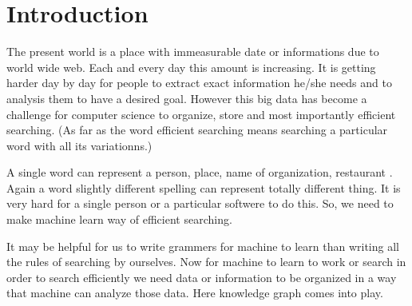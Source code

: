 \chapter{Introduction}\label{intro}

The present world is a place with immeasurable date or informations due to world wide web.
 Each and every day this amount is increasing. It is getting harder day by day for people to extract 
 exact information he/she needs and to analysis them to have a desired goal. However this big data 
 has become a challenge for computer science to organize, 
 store and most importantly efficient searching. (As far as the word  efficient searching means 
 searching a particular word with all its variationns.) 

A single word can represent a person, place, name of organization, restaurant . Again a word slightly different 
spelling can represent totally different thing. It is very hard for a single person or a particular 
softwere to do this. So, we need to make machine learn way of efficient searching.

It may be helpful for us to write grammers for machine to learn than writing all 
the rules of searching by ourselves.
Now for machine to learn to work or search in order to search efficiently we need 
data or information to be organized in a way that machine can analyze those data.
Here knowledge graph comes into play.

\endinput